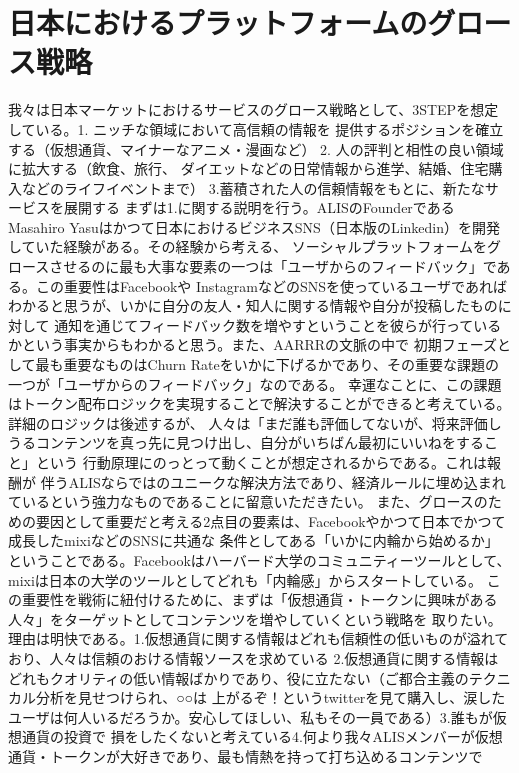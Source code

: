 \documentclass{jsarticle}
\begin{document}
\section{日本におけるプラットフォームのグロース戦略}
我々は日本マーケットにおけるサービスのグロース戦略として、3STEPを想定している。1. ニッチな領域において高信頼の情報を
提供するポジションを確立する（仮想通貨、マイナーなアニメ・漫画など） 2. 人の評判と相性の良い領域に拡大する（飲食、旅行、
ダイエットなどの日常情報から進学、結婚、住宅購入などのライフイベントまで） 3.蓄積された人の信頼情報をもとに、新たなサービスを展開する
まずは1.に関する説明を行う。ALISのFounderである
Masahiro Yasuはかつて日本におけるビジネスSNS（日本版のLinkedin）を開発していた経験がある。その経験から考える、
ソーシャルプラットフォームをグロースさせるのに最も大事な要素の一つは「ユーザからのフィードバック」である。この重要性はFacebookや
InstagramなどのSNSを使っているユーザであればわかると思うが、いかに自分の友人・知人に関する情報や自分が投稿したものに対して
通知を通じてフィードバック数を増やすということを彼らが行っているかという事実からもわかると思う。また、AARRRの文脈の中で
初期フェーズとして最も重要なものはChurn Rateをいかに下げるかであり、その重要な課題の一つが「ユーザからのフィードバック」なのである。
幸運なことに、この課題はトークン配布ロジックを実現することで解決することができると考えている。詳細のロジックは後述するが、
人々は「まだ誰も評価してないが、将来評価しうるコンテンツを真っ先に見つけ出し、自分がいちばん最初にいいねをすること」という
行動原理にのっとって動くことが想定されるからである。これは報酬が
伴うALISならではのユニークな解決方法であり、経済ルールに埋め込まれているという強力なものであることに留意いただきたい。
また、グロースのための要因として重要だと考える2点目の要素は、Facebookやかつて日本でかつて成長したmixiなどのSNSに共通な
条件としてある「いかに内輪から始めるか」ということである。Facebookはハーバード大学のコミュニティーツールとして、
mixiは日本の大学のツールとしてどれも「内輪感」からスタートしている。
この重要性を戦術に紐付けるために、まずは「仮想通貨・トークンに興味がある人々」をターゲットとしてコンテンツを増やしていくという戦略を
取りたい。理由は明快である。1.仮想通貨に関する情報はどれも信頼性の低いものが溢れており、人々は信頼のおける情報ソースを求めている
2.仮想通貨に関する情報はどれもクオリティの低い情報ばかりであり、役に立たない（ご都合主義のテクニカル分析を見せつけられ、○○は
上がるぞ！というtwitterを見て購入し、涙したユーザは何人いるだろうか。安心してほしい、私もその一員である）3.誰もが仮想通貨の投資で
損をしたくないと考えている4.何より我々ALISメンバーが仮想通貨・トークンが大好きであり、最も情熱を持って打ち込めるコンテンツで
\end{document}
